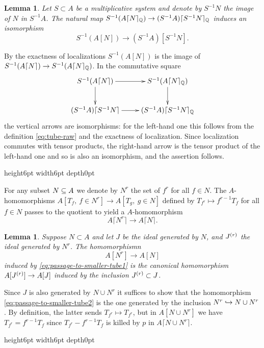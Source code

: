\documentclass{article}
\theoremstyle{change}
\newtheorem{lemma}[subsubsection]{Lemma}
\numberwithin{equation}{subsubsection}
\newcommand{\demobox}{\vrule height6pt width6pt depth0pt}
\newenvironment{demo}{\noindent{\it Proof.}}
{{\unskip\nobreak\hfil\qquad
\demobox\parfillskip=0pt\par}
\medskip}
\newcommand\lc{\lceil}
\newcommand\rc{\rceil}
\begin{document}
\begin{lemma}\label{lemma:tube-commutes-with-localization}
  Let $S\subset A$ be a multiplicative system and denote by $S^{-1}N$
  the image of $N$ in $S^{-1}A$. The natural map
  $S^{-1}(A\lc N\rc_\bQ)\to (S^{-1}A)\lc S^{-1}N\rc_\bQ$ induces an
  isomorphism
  \begin{displaymath}
    S^{-1}(A[N])\to (S^{-1}A)[S^{-1}N].
  \end{displaymath}
\end{lemma}
\begin{demo}
  By the exactness of localizations $S^{-1}(A[N])$ is the image of
  $S^{-1}(A\lc N\rc)\to S^{-1}(A\lc N\rc_\bQ)$. In the commutative
  square
  \begin{displaymath}
    \xymatrix{
      S^{-1}(A\lc N\rc)\ar[r]\ar[d]&
      S^{-1}(A\lc N\rc_\bQ)\ar[d]\\
      (S^{-1}A)\lc S^{-1}N\rc\ar[r]&
      (S^{-1}A)\lc S^{-1}N\rc_\bQ\\
    }
  \end{displaymath}
  the vertical arrows are isomorphisms: for the left-hand one this
  follows from the definition \ref{eq:tube-raw} and the exactness of
  localization. Since localization commutes with tensor products, the
  right-hand arrow is the tensor product of the left-hand one and so
  is also an isomorphism, and the assertion follows.
\end{demo}

For any subset $N\subseteq A$ we denote by $N^r$ the set of $f^r$ for all
$f\in N$. The $A$-homomorphisms $A[T_f,\ f\in N^r]\to A[T_g,\ g\in N]$
defined by $T_{f^r}\mapsto f^{r-1}T_f$ for all $f\in N$ passes to the
quotient to yield a $A$-homomorphism
\begin{equation}
  \label{eq:passage-to-smaller-tube1}
  A\lc N^r\rc\to A\lc N\rc.
\end{equation}

\begin{lemma}\label{lemma:passage-to-smaller-tube}
  Suppose $N\subset A$ and let $J$ be the ideal generated by $N$, and
  ${J}^{({r})}$ the ideal generated by $N^r$. The homomorphismn
  \begin{equation}
    \label{eq:passage-to-smaller-tube2}
    A[N^r]\to A[N]
  \end{equation}
  induced by \ref{eq:passage-to-smaller-tube1} is the canonical
  homomorphism $A[{J}^{({r})}]\to A[J]$ induced by the inclusion
  ${J}^{({r})}\subset J$.
\end{lemma}
\begin{demo}
  Since $J$ is also generated by $N\cup N^r$ it suffices to show that
  the homomorphism \ref{eq:passage-to-smaller-tube2} is the one
  generated by the inclusion $N^r\hookrightarrow N\cup N^r$. By definition, the
  latter sends $T_{f^r}\mapsto T_{f^r}$, but in $A[N\cup N^r]$ we have
  $T_{f^r}=f^{r-1}T_f$ since $T_{f^r}-f^{r-1}T_f$ is killed by $p$ in
  $A\lc N\cup N^r\rc$.
\end{demo}
\end{document}
